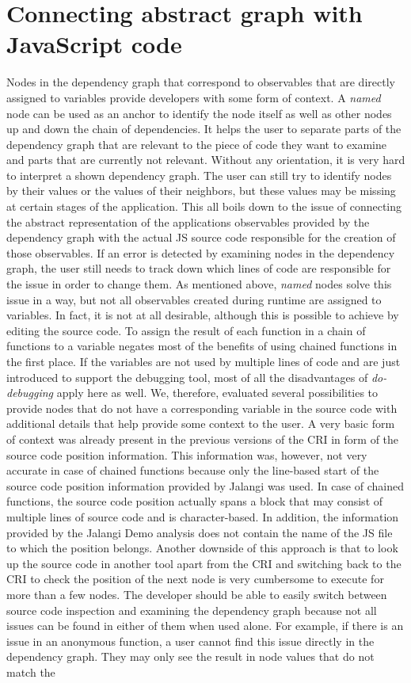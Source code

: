 \section{Connecting abstract graph with JavaScript code}
Nodes in the dependency graph that correspond to observables that are directly assigned to variables provide developers with some form of context. A \emph{named} node can be used as an anchor to identify the node itself as well as other nodes up and down the chain of dependencies. It helps the user to separate parts of the dependency graph that are relevant to the piece of code they want to examine and parts that are currently not relevant. Without any orientation, it is very hard to interpret a shown dependency graph. The user can still try to identify nodes by their values or the values of their neighbors, but these values may be missing at certain stages of the application. This all boils down to the issue of connecting the abstract representation of the applications observables provided by the dependency graph with the actual JS source code responsible for the creation of those observables. If an error is detected by examining nodes in the dependency graph, the user still needs to track down which lines of code are responsible for the issue in order to change them. As mentioned above, \emph{named} nodes solve this issue in a way, but not all observables created during runtime are assigned to variables. In fact, it is not at all desirable, although this is possible to achieve by editing the source code. To assign the result of each function in a chain of functions to a variable negates most of the benefits of using chained functions in the first place. If the variables are not used by multiple lines of code and are just introduced to support the debugging tool, most of all the disadvantages of \emph{do-debugging} apply here as well. We, therefore, evaluated several possibilities to provide nodes that do not have a corresponding variable in the source code with additional details that help provide some context to the user. A very basic form of context was already present in the previous versions of the CRI in form of the source code position information. This information was, however, not very accurate in case of chained functions because only the line-based start of the source code position information provided by Jalangi was used. In case of chained functions, the source code position actually spans a block that may consist of multiple lines of source code and is character-based. In addition, the information provided by the Jalangi Demo analysis does not contain the name of the JS file to which the position belongs. Another downside of this approach is that to look up the source code in another tool apart from the CRI and switching back to the CRI to check the position of the next node is very cumbersome to execute for more than a few nodes. The developer should be able to easily switch between source code inspection and examining the dependency graph because not all issues can be found in either of them when used alone. For example, if there is an issue in an anonymous function, a user cannot find this issue directly in the dependency graph. They may only see the result in node values that do not match the 